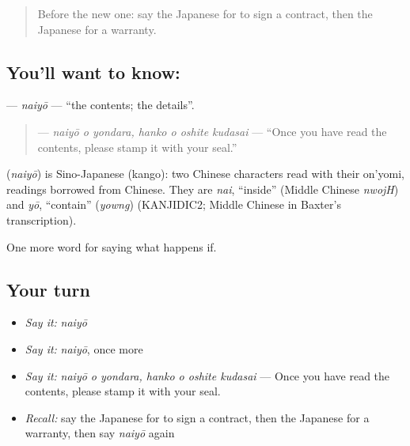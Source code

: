 \label{lesson:JA-C357-naiyou}



\begin{quote}
Before the new one: say the Japanese for to sign a contract, then the Japanese for a warranty.
\end{quote}

\subsection*{You'll want to know: }
\textbf{} — \emph{naiyō} — \textquotedblleft{}the contents; the details\textquotedblright{}.

\begin{quote}
\textbf{   } — \emph{naiyō o yondara, hanko o oshite kudasai} — \textquotedblleft{}Once you have read the contents, please stamp it with your seal.\textquotedblright{}
\end{quote}

\begin{cousinweb}
\textbf{} (\emph{naiyō}) is Sino-Japanese (kango): two Chinese characters read with their on'yomi, readings borrowed from Chinese. They are \emph{nai}, \textquotedblleft{}inside\textquotedblright{} (Middle Chinese \emph{nwojH}) and \emph{yō}, \textquotedblleft{}contain\textquotedblright{} (\emph{yowng}) (KANJIDIC2; Middle Chinese in Baxter's transcription).
\end{cousinweb}

\begin{grammarlens}[title={What you've built}]
One more word for saying what happens if.
\end{grammarlens}

\subsection*{Your turn}
\begin{itemize}
\raggedright
  \item \emph{Say it:} \emph{naiyō}
  \item \emph{Say it:} \emph{naiyō}, once more
  \item \emph{Say it:} \emph{naiyō o yondara, hanko o oshite kudasai} — Once you have read the contents, please stamp it with your seal.
  \item \emph{Recall:} say the Japanese for to sign a contract, then the Japanese for a warranty, then say \emph{naiyō} again
\end{itemize}

